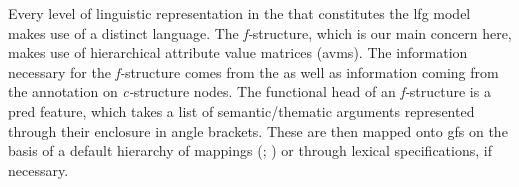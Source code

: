 \documentclass[output=paper]{LSP/langsci}
\begin{document}
Every level of linguistic representation in the  that constitutes the {\sc lfg} model makes use of a distinct language. The \emph{f-}structure, which is our main concern here, makes use of hierarchical attribute value matrices ({\sc avm}s). The information necessary for the \emph{f-}structure comes from the  as well as information coming from the annotation on \emph{c-}structure nodes. The functional head of an \emph{f-}structure is a {\sc pred} feature, which takes a list of semantic/thematic arguments represented through their enclosure in angle brackets. These are then mapped onto {\sc gf}s on the basis of a default hierarchy of mappings (; ) or through lexical specifications, if necessary. %
\end{document}
